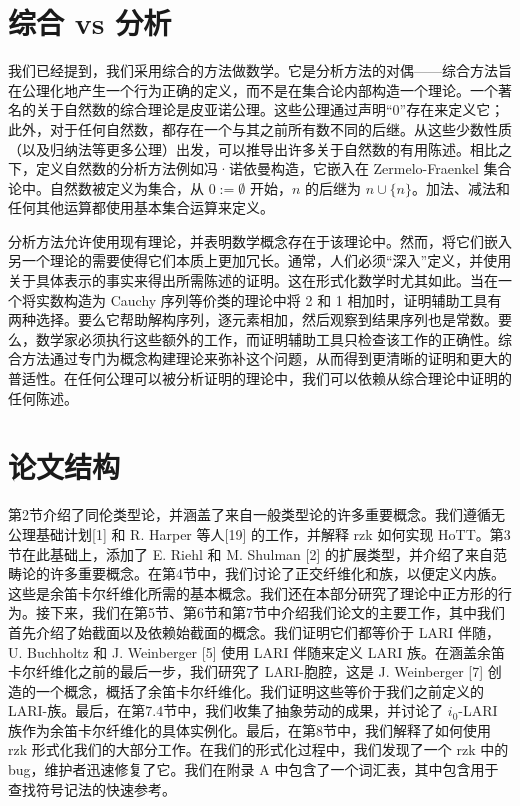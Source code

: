 \documentclass{ctexrep}
\theoremstyle{plain}
\theoremstyle{definition}
\theoremstyle{remark}
\theoremstyle{definition}
\theoremstyle{definition}
\theoremstyle{definition}
\newcommand{\coloneqq}{\mathrel{:=}}
\begin{document}
\section{综合 vs 分析}

我们已经提到，我们采用综合的方法做数学。它是分析方法的对偶——综合方法旨在公理化地产生一个行为正确的定义，而不是在集合论内部构造一个理论。一个著名的关于自然数的综合理论是皮亚诺公理。这些公理通过声明“0”存在来定义它；此外，对于任何自然数，都存在一个与其之前所有数不同的后继。从这些少数性质（以及归纳法等更多公理）出发，可以推导出许多关于自然数的有用陈述。相比之下，定义自然数的分析方法例如冯·诺依曼构造，它嵌入在 Zermelo-Fraenkel 集合论中。自然数被定义为集合，从 $0\coloneqq \emptyset$ 开始，$n$ 的后继为 $n\cup \{n\}$。加法、减法和任何其他运算都使用基本集合运算来定义。

分析方法允许使用现有理论，并表明数学概念存在于该理论中。然而，将它们嵌入另一个理论的需要使得它们本质上更加冗长。通常，人们必须“深入”定义，并使用关于具体表示的事实来得出所需陈述的证明。这在形式化数学时尤其如此。当在一个将实数构造为 Cauchy 序列等价类的理论中将 2 和 1 相加时，证明辅助工具有两种选择。要么它帮助解构序列，逐元素相加，然后观察到结果序列也是常数。要么，数学家必须执行这些额外的工作，而证明辅助工具只检查该工作的正确性。综合方法通过专门为概念构建理论来弥补这个问题，从而得到更清晰的证明和更大的普适性。在任何公理可以被分析证明的理论中，我们可以依赖从综合理论中证明的任何陈述。

\section{论文结构}

第2节介绍了同伦类型论，并涵盖了来自一般类型论的许多重要概念。我们遵循无公理基础计划[1] 和 R. Harper 等人[19] 的工作，并解释 \textsf{rzk} 如何实现 HoTT。第3节在此基础上，添加了 E. Riehl 和 M. Shulman [2] 的扩展类型，并介绍了来自范畴论的许多重要概念。在第4节中，我们讨论了正交纤维化和族，以便定义内族。这些是余笛卡尔纤维化所需的基本概念。我们还在本部分研究了理论中正方形的行为。接下来，我们在第5节、第6节和第7节中介绍我们论文的主要工作，其中我们首先介绍了始截面以及依赖始截面的概念。我们证明它们都等价于 LARI 伴随，U. Buchholtz 和 J. Weinberger [5] 使用 LARI 伴随来定义 LARI 族。在涵盖余笛卡尔纤维化之前的最后一步，我们研究了 LARI-胞腔，这是 J. Weinberger [7] 创造的一个概念，概括了余笛卡尔纤维化。我们证明这些等价于我们之前定义的 LARI-族。最后，在第7.4节中，我们收集了抽象劳动的成果，并讨论了 $i_0$-LARI 族作为余笛卡尔纤维化的具体实例化。最后，在第8节中，我们解释了如何使用 \textsf{rzk} 形式化我们的大部分工作。在我们的形式化过程中，我们发现了一个 \textsf{rzk} 中的 bug，维护者迅速修复了它。我们在附录 A 中包含了一个词汇表，其中包含用于查找符号记法的快速参考。
\end{document}
